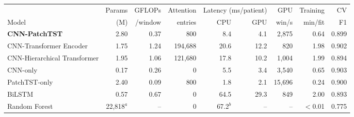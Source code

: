 \begin{tabular}{lrrrrrrrr}
\toprule
 & Params & GFLOPs & Attention & \multicolumn{2}{c}{Latency (ms/patient)} & GPU & Training & CV \\
\cmidrule(lr){5-6}
Model & (M) & /window & entries & CPU & GPU & win/s & min/fit & F1 \\
\midrule
\textbf{CNN-PatchTST} & 2.80 & 0.37 & 800 & 8.4 & 4.1 & 2{,}875 & 0.64 & 0.899 \\
CNN-Transformer Encoder & 1.75 & 1.24 & 194{,}688 & 20.6 & 12.2 & 820 & 1.98 & 0.902 \\
CNN-Hierarchical Transformer & 1.95 & 1.06 & 121{,}680 & 17.8 & 10.2 & 1{,}004 & 1.99 & 0.894 \\
CNN-only & 0.17 & 0.26 & 0 & 5.5 & 3.4 & 3{,}540 & 0.65 & 0.903 \\
PatchTST-only & 2.40 & 0.09 & 800 & 1.8 & 2.1 & 15{,}696 & 0.24 & 0.900 \\
BiLSTM & 0.57 & 0.67 & 0 & 64.5 & 29.3 & 849 & 2.00 & 0.893 \\
Random Forest & 22{,}818$^{a}$ & -- & 0 & 67.2$^{b}$ & -- & -- & $<$0.01 & 0.775 \\
\bottomrule
\end{tabular}
